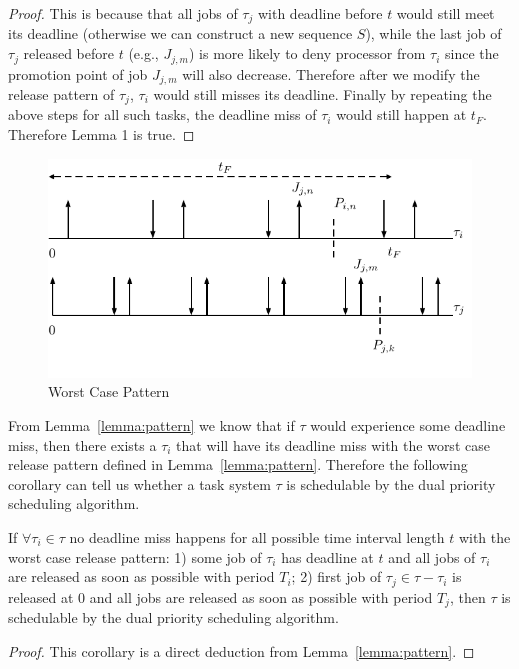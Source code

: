 {\begin{proof}
This is because that all jobs of $\tau_j$ with deadline before $t$ would still meet its deadline (otherwise we can construct a new sequence $S$), while the last job of $\tau_j$ released before $t$ (e.g., $J_{j,m}$) is more likely to  deny processor from $\tau_i$ since the promotion point of job $J_{j,m}$ will also decrease. Therefore after we modify the release pattern of $\tau_j$, $\tau_i$ would still misses its deadline. Finally by repeating the above steps for all such tasks, the deadline miss of $\tau_i$ would still happen at $t_F$. Therefore Lemma 1 is true.
\end{proof}
\begin{figure}[h!]
 \centering
\includegraphics[scale=0.7]{Figure/WC}  
\caption{Worst Case  Pattern}
  \label{fig:case2}
\end{figure}
From Lemma~\ref{lemma:pattern} we know that if $\tau$ would  experience some deadline miss, then there exists a $\tau_i$ that will have its  deadline miss with the worst case release pattern defined in Lemma~\ref{lemma:pattern}. Therefore the following corollary can tell us whether a task system $\tau$ is schedulable by the dual priority scheduling algorithm.

\begin{corollary}
\label{corollary:condition}
If  $\forall \tau_i\in \tau$ no deadline miss happens for all possible time interval length $t$ with the worst case release pattern:  1) some job of $\tau_i$ has deadline at $t$  and all jobs of $\tau_i$ are released as soon as possible  with period $T_i$; 2) first job of $\tau_j\in \tau-\tau_i$ is released at $0$ and all jobs are released as soon as possible with period $T_j$, then $\tau$ is schedulable by the dual priority scheduling algorithm.
\end{corollary}
\begin{proof}
This corollary is a direct deduction from Lemma~\ref{lemma:pattern}.
\end{proof}


}
